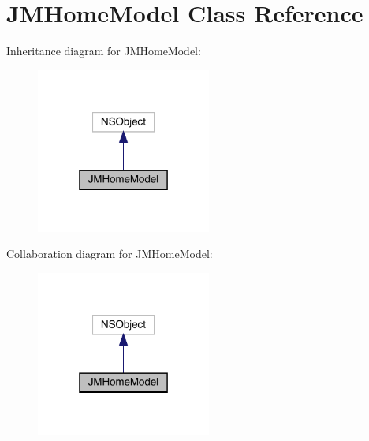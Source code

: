 \hypertarget{interface_j_m_home_model}{}\section{J\+M\+Home\+Model Class Reference}
\label{interface_j_m_home_model}


Inheritance diagram for J\+M\+Home\+Model\+:\nopagebreak
\begin{figure}[H]
\begin{center}
\leavevmode
\includegraphics[width=163pt]{interface_j_m_home_model__inherit__graph}
\end{center}
\end{figure}


Collaboration diagram for J\+M\+Home\+Model\+:\nopagebreak
\begin{figure}[H]
\begin{center}
\leavevmode
\includegraphics[width=163pt]{interface_j_m_home_model__coll__graph}
\end{center}
\end{figure}
